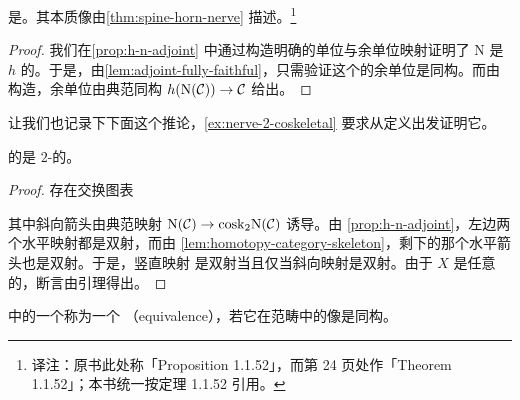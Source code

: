 \begin{corollary}\label{cor:nerve-fully-faithful}
\trNerve{}\trFunctor{}是\trFullyFaithful{}。其本质像由\cref{thm:spine-horn-nerve}
描述。\footnote{译注：原书此处称「Proposition 1.1.52」，而第 24 页处作「Theorem
1.1.52」；本书统一按定理 1.1.52 引用。}
\end{corollary}

\begin{proof}
我们在\cref{prop:h-n-adjoint} 中通过构造明确的单位与余单位映射证明了 $\mathrm{N}$
是 $h$ 的\trRightAdjoint{}。于是，由\cref{lem:adjoint-fully-faithful}，只需验证这个\trAdjunction{}的余单位是同构。而由构造，余单位由典范同构 $h(\mathrm{N}(\mathcal{C})) \to \mathcal{C}$ 给出。
\end{proof}

让我们也记录下下面这个推论，\cref{ex:nerve-2-coskeletal} 要求从定义出发证明它。

\begin{corollary}\label{cor:nerve-2-coskeletal}
\trCategory{}的\trNerve{}是 $2$-\trCoskeleton{}的。
\end{corollary}

\begin{proof}
存在交换图表
\begin{center}
\end{center}
其中斜向箭头由典范映射 $\mathrm{N}(\mathcal{C}) \to \mathrm{cosk}_2 \mathrm{N}(\mathcal{C})$ 诱导。由
\cref{prop:h-n-adjoint}，左边两个水平映射都是双射，而由%
\cref{lem:homotopy-category-skeleton}，剩下的那个水平箭头也是双射。于是，竖直映射
是双射当且仅当斜向映射是双射。由于 $X$ 是任意的，断言由\trYoneda{}引理得出。
\end{proof}

\begin{definition}\label{def:equivalence-infinity-category}
\trInfinityCategory{}中的一个\trMorphism{}称为一个\emph{\trEquivalence{}}
（equivalence），若它在\trHomotopy{}范畴中的像是同构。
\end{definition}


